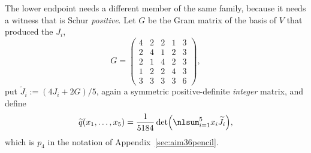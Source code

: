 \begin{cxrefutation}
The lower endpoint needs a different member of the same family, because it needs a witness that is Schur \emph{positive}.  Let $G$ be the Gram matrix of the basis of $V$ that produced the $J_i$,
\[
G=\begin{pmatrix}
4&2&2&1&3\\
2&4&1&2&3\\
2&1&4&2&3\\
1&2&2&4&3\\
3&3&3&3&6
\end{pmatrix},
\]
put $\widetilde J_i:=(4J_i+2G)/5$, again a symmetric positive-definite \emph{integer} matrix, %
and define
\begin{equation}\label{eq:aim36-qtilde}
\widetilde q(x_1,\ldots,x_5)=\frac1{5184}\det\Bigl(\nlsum_{i=1}^5x_i\widetilde J_i\Bigr),
\end{equation}
which is $p_4$ in the notation of Appendix~\ref{sec:aim36pencil}.


\end{cxrefutation}
